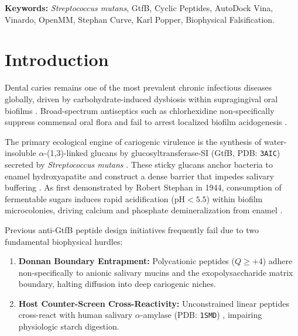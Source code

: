 \documentclass[11pt,a4paper]{article}
\begin{document}
\begin{abstract}
\textbf{Conclusions:} Stephan-selective cyclic peptide macrocycles provide a computationally corroborated anti-virulence hypothesis. However, all findings are strictly in silico computational predictions requiring wet-lab enzymatic, whole human saliva, and cellular biofilm falsification prior to translational claims.
\end{abstract}

\vspace{0.5em}
\noindent\textbf{Keywords:} \textit{Streptococcus mutans}, GtfB, Cyclic Peptides, AutoDock Vina, Vinardo, OpenMM, Stephan Curve, Karl Popper, Biophysical Falsification.

\section{Introduction}

Dental caries remains one of the most prevalent chronic infectious diseases globally, driven by carbohydrate-induced dysbiosis within supragingival oral biofilms \cite{Bowen2018, Marsh2006}. Broad-spectrum antiseptics such as chlorhexidine non-specifically suppress commensal oral flora and fail to arrest localized biofilm acidogenesis \cite{Scharnow2019}.

The primary ecological engine of cariogenic virulence is the synthesis of water-insoluble $\alpha$-(1,3)-linked glucans by glucosyltransferase-SI (GtfB, PDB: \texttt{3AIC}) secreted by \textit{Streptococcus mutans} \cite{Ito2011, Koo2013}. These sticky glucans anchor bacteria to enamel hydroxyapatite and construct a dense barrier that impedes salivary buffering \cite{Xiao2012}. As first demonstrated by Robert Stephan in 1944, consumption of fermentable sugars induces rapid acidification ($\text{pH} < 5.5$) within biofilm microcolonies, driving calcium and phosphate demineralization from enamel \cite{Stephan1944, Zero1999, Burne2000}.

Previous anti-GtfB peptide design initiatives frequently fail due to two fundamental biophysical hurdles:
\begin{enumerate}
    \item \textbf{Donnan Boundary Entrapment:} Polycationic peptides ($Q \ge +4$) adhere non-specifically to anionic salivary mucins and the exopolysaccharide matrix boundary, halting diffusion into deep cariogenic niches.
    \item \textbf{Host Counter-Screen Cross-Reactivity:} Unconstrained linear peptides cross-react with human salivary $\alpha$-amylase (PDB: \texttt{1SMD}) \cite{Ramasubbu1996}, impairing physiologic starch digestion.
\end{enumerate}
\end{document}

